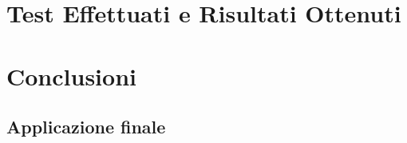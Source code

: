 \documentclass[11pt]{report}
\begin{document}
\chapter{Test Effettuati e Risultati Ottenuti}

\chapter{Conclusioni}
\label{cap:Conclusioni}
\section{Applicazione finale}



\end{document}

